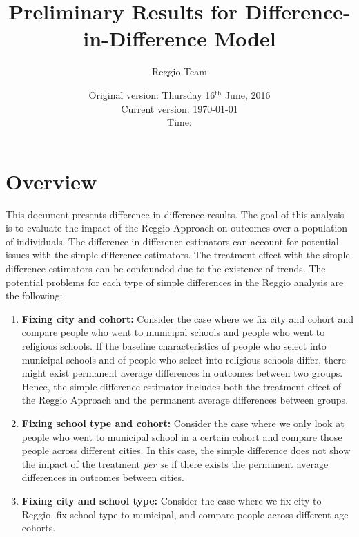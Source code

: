 \documentclass[11pt]{article}
\begin{document}
\title{Preliminary Results for Difference-in-Difference Model}
\author{Reggio Team}
\date{Original version: Thursday  16$^{\text{th}}$ June, 2016 \\ Current version: \today \\ \vspace{1em} Time: \currenttime}
\maketitle

\listoftables

\doublespacing

\section{Overview}

This document presents difference-in-difference results. The goal of this analysis is to evaluate the impact of the Reggio Approach on outcomes over a population of individuals. The difference-in-difference estimators can account for potential issues with the simple difference estimators. The treatment effect with the simple difference estimators can be confounded due to the existence of trends. The potential problems for each type of simple differences in the Reggio analysis are the following: 
\begin{enumerate}
\item \textbf{Fixing city and cohort:} Consider the case where we fix city and cohort and compare people who went to municipal schools and people who went to religious schools. If the baseline characteristics of people who select into municipal schools and of people who select into religious schools differ, there might exist permanent average differences in outcomes between two groups. Hence, the simple difference estimator includes both the treatment effect of the Reggio Approach and the permanent average differences between groups. 
\item \textbf{Fixing school type and cohort:} Consider the case where we only look at people who went to municipal school in a certain cohort and compare those people across different cities. In this case, the simple difference does not show the impact of the treatment \textit{per se} if there exists the permanent average differences in outcomes between cities. 
\item \textbf{Fixing city and school type:} Consider the case where we fix city to Reggio, fix school type to municipal, and compare people across different age cohorts. 
\end{enumerate}
\end{document}
